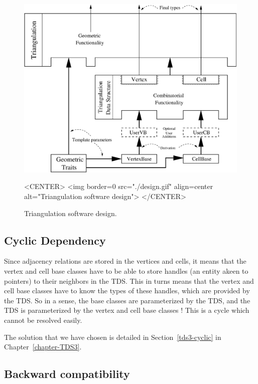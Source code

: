 \begin{figure}[htbp]
\begin{ccTexOnly}
\begin{center}
\includegraphics[width=13cm]{design.eps}
\end{center}
\end{ccTexOnly}
\caption{Triangulation software design.
\label{T3-fig-layers}}
\begin{ccHtmlOnly}
<CENTER>
<img border=0 src="./design.gif" align=center
 alt="Triangulation software design">
</CENTER>
\end{ccHtmlOnly}
\end{figure}

\subsection{Cyclic Dependency}

Since adjacency relations are stored in the vertices and cells, it means that
the vertex and cell base classes have to be able to store handles (an entity
akeen to pointers) to their neighbors in the TDS.  This in turns means that the
vertex and cell base classes have to know the types of these handles, which are
provided by the TDS.  So in a sense, the base classes are parameterized by the
TDS, and the TDS is parameterized by the vertex and cell base classes !
This is a cycle which cannot be resolved easily.

The solution that we have chosen is detailed in Section~\ref{tds3-cyclic} in
Chapter~\ref{chapter-TDS3}.

\subsection{Backward compatibility}

